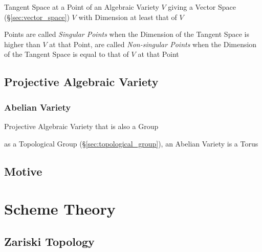 Tangent Space at a Point of an Algebraic Variety $V$ giving a Vector Space
(\S\ref{sec:vector_space}) $V$ with Dimension at least that of $V$

Points are called \emph{Singular Points} when the Dimension of the Tangent
Space is higher than $V$ at that Point, are called \emph{Non-singular Points}
when the Dimension of the Tangent Space is equal to that of $V$ at that Point



\subsection{Projective Algebraic Variety}
\label{sec:projective_algebraic_variety}

\subsubsection{Abelian Variety}\label{sec:abelian_variety}

Projective Algebraic Variety that is also a Group

as a Topological Group (\S\ref{sec:topological_group}), an Abelian Variety is a
Torus %



\subsection{Motive}\label{sec:motive}



\section{Scheme Theory}\label{sec:scheme_theory}

\subsection{Zariski Topology}\label{sec:zariski_topology}

